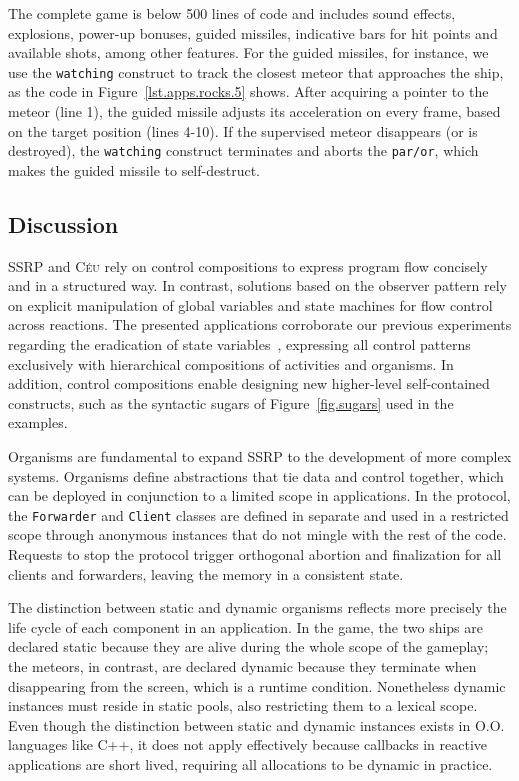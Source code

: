 \documentclass{sigplanconf}
\newcommand{\CEU}{\textsc{C\'{e}u}\xspace}
\newcommand{\code}[1] {{\small{\texttt{#1}}}}
\newcommand{\1}{\;}
\newcommand{\2}{\;\;}
\newcommand{\3}{\;\;\;}
\newcommand{\5}{\;\;\;\;\;}
\begin{document}
The complete game is below 500 lines of code and includes sound effects, 
explosions, power-up bonuses, guided missiles, indicative bars for hit points 
and available shots, among other features.
%
For the guided missiles, for instance, we use the \code{watching} construct to 
track the closest meteor that approaches the ship, as the code in 
Figure~\ref{lst.apps.rocks.5} shows.
After acquiring a pointer to the meteor (line 1), the guided missile adjusts 
its acceleration on every frame, based on the target position (lines 4-10).
%
If the supervised meteor disappears (or is destroyed), the \code{watching} 
construct terminates and aborts the \code{par/or}, which makes the guided 
missile to self-destruct.

\subsection{Discussion}

SSRP and \CEU rely on control compositions to express program flow concisely 
and in a structured way.
%
In contrast, solutions based on the observer pattern rely on explicit 
manipulation of global variables and state machines for flow control across 
reactions.
%
The presented applications corroborate our previous experiments regarding the 
eradication of state variables~\cite{ceu.sensys13}, expressing all control 
patterns exclusively with hierarchical compositions of activities and 
organisms.
%
In addition, control compositions enable designing new higher-level 
self-contained constructs, such as the syntactic sugars of 
Figure~\ref{fig.sugars} used in the examples.

Organisms are fundamental to expand SSRP to the development of more complex 
systems.
%
Organisms define abstractions that tie data and control together, which can be 
deployed in conjunction to a limited scope in applications.
%
In the protocol, the \code{Forwarder} and \code{Client} classes are defined in 
separate and used in a restricted scope through anonymous instances that do not 
mingle with the rest of the code.
Requests to stop the protocol trigger orthogonal abortion and finalization for 
all clients and forwarders, leaving the memory in a consistent state.
%

The distinction between static and dynamic organisms reflects more precisely 
the life cycle of each component in an application.
%
In the game, the two ships are declared static because they are alive during 
the whole scope of the gameplay; the meteors, in contrast, are declared dynamic 
because they terminate when disappearing from the screen, which is a runtime 
condition.
Nonetheless dynamic instances must reside in static pools, also restricting 
them to a lexical scope.
%
Even though the distinction between static and dynamic instances exists in O.O.  
languages like C++, it does not apply effectively because callbacks in reactive 
applications are short lived, requiring all allocations to be dynamic in 
practice.
\end{document}
